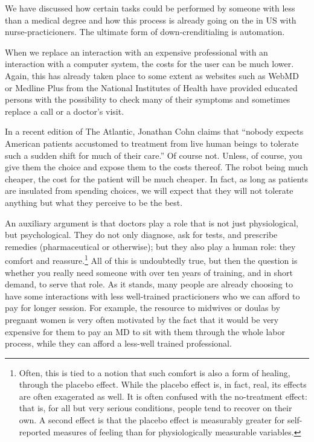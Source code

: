 We have discussed how certain tasks could be performed by someone with less
than a medical degree and how this process is already going on the in US with
nurse-practicioners. The ultimate form of down-crenditialing is automation.

When we replace an interaction with an expensive professional with an
interaction with a computer system, the costs for the user can be much lower.
Again, this has already taken place to some extent as websites such as WebMD or
Medline Plus from the National Institutes of Health have provided educated
persons with the possibility to check many of their symptoms and sometimes
replace a call or a doctor's visit.

In a recent edition of The Atlantic, Jonathan Cohn claims that ``nobody expects
American patients accustomed to treatment from live human beings to tolerate
such a sudden shift for much of their care.'' Of course not. Unless,
of course, you give them the choice and expose them to the costs thereof. The
robot being much cheaper, the cost for the patient will be much cheaper. In
fact, as long as patients are insulated from spending choices, we will expect
that they will not tolerate anything but what they perceive to be the best.

An auxiliary argument is that doctors play a role that is not just
physiological, but psychological. They do not only diagnose, ask for tests, and
prescribe remedies (pharmaceutical or otherwise); but they also play a human
role: they comfort and reassure.\footnote{Often, this is tied to a notion that
such comfort is also a form of healing, through the placebo effect. While the
placebo effect is, in fact, real, its effects are often exagerated as well. It
is often confused with the no-treatment effect: that is, for all but very
serious conditions, people tend to recover on their own. A second effect is
that the placebo effect is measurably greater for self-reported measures of
feeling than for physiologically measurable variables.} All of this is
undoubtedly true, but then the question is whether you really need someone with
over ten years of training, and in short demand, to serve that role. As it
stands, many people are already choosing to have some interactions with less
well-trained practicioners who we can afford to pay for longer session.  For
example, the resource to midwives or doulas by pregnant women is very often
motivated by the fact that it would be very expensive for them to pay an MD to
sit with them through the whole labor process, while they can afford a
less-well trained professional.

